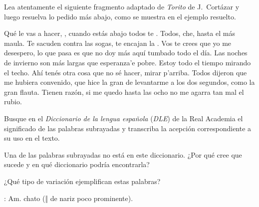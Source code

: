 \begin{ejercicio}\label{ej:02-torito}
Lea atentamente el siguiente fragmento adaptado de \textit{Torito} de
J.~Cortázar y luego resuelva lo pedido más abajo, como se muestra en el ejemplo
resuelto.

\begin{cita}
Qué le vas a hacer, , cuando estás abajo todos te
. Todos, che, hasta el más maula. Te sacuden contra las sogas,
te encajan la . Vos te crees que yo me desespero, lo que pasa
es que no doy más aquí tumbado todo el día. Las noches de invierno son más
largas que esperanza'e pobre. Estoy todo el tiempo mirando el techo. Ahí tenés
otra cosa que no sé hacer, mirar p'arriba. Todos dijeron que me hubiera
convenido, que hice la gran  de levantarme a los dos
segundos,  como la gran flauta. Tienen razón, si me quedo
hasta las ocho no me agarra tan mal el rubio.
\end{cita}

\begin{consignas}
  \item Busque en el \textit{Diccionario de la lengua española} (\textit{DLE})
        de la Real Academia el significado de las palabras subrayadas y
        transcriba la acepción correspondiente a su uso en el texto.
  \item Una de las palabras subrayadas no está en este diccionario. ¿Por qué
        cree que sucede y en qué diccionario podría encontrarla?
  \item ¿Qué tipo de variación ejemplifican estas palabras?
\end{consignas}

\begin{resuelto}
: Am. chato (‖ de nariz poco prominente).
\end{resuelto}
\end{ejercicio}

